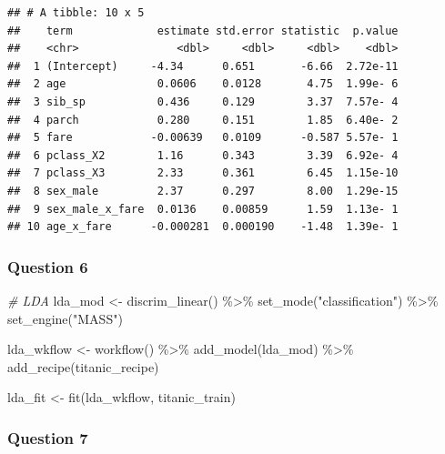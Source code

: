 \documentclass[
]{article}
\newenvironment{Shaded}{\begin{snugshade}}{\end{snugshade}}
\newcommand{\CommentTok}[1]{\textcolor[rgb]{0.56,0.35,0.01}{\textit{#1}}}
\newcommand{\FunctionTok}[1]{\textcolor[rgb]{0.00,0.00,0.00}{#1}}
\newcommand{\NormalTok}[1]{#1}
\newcommand{\OtherTok}[1]{\textcolor[rgb]{0.56,0.35,0.01}{#1}}
\newcommand{\SpecialCharTok}[1]{\textcolor[rgb]{0.00,0.00,0.00}{#1}}
\newcommand{\StringTok}[1]{\textcolor[rgb]{0.31,0.60,0.02}{#1}}
\begin{document}
\begin{verbatim}
## # A tibble: 10 x 5
##    term             estimate std.error statistic  p.value
##    <chr>               <dbl>     <dbl>     <dbl>    <dbl>
##  1 (Intercept)     -4.34      0.651       -6.66  2.72e-11
##  2 age              0.0606    0.0128       4.75  1.99e- 6
##  3 sib_sp           0.436     0.129        3.37  7.57e- 4
##  4 parch            0.280     0.151        1.85  6.40e- 2
##  5 fare            -0.00639   0.0109      -0.587 5.57e- 1
##  6 pclass_X2        1.16      0.343        3.39  6.92e- 4
##  7 pclass_X3        2.33      0.361        6.45  1.15e-10
##  8 sex_male         2.37      0.297        8.00  1.29e-15
##  9 sex_male_x_fare  0.0136    0.00859      1.59  1.13e- 1
## 10 age_x_fare      -0.000281  0.000190    -1.48  1.39e- 1
\end{verbatim}

\hypertarget{question-6}{%
\subsubsection{Question 6}\label{question-6}}

\begin{Shaded}
\begin{Highlighting}[]
\CommentTok{\# LDA}
\NormalTok{lda\_mod }\OtherTok{\textless{}{-}} \FunctionTok{discrim\_linear}\NormalTok{() }\SpecialCharTok{\%\textgreater{}\%}
  \FunctionTok{set\_mode}\NormalTok{(}\StringTok{"classification"}\NormalTok{) }\SpecialCharTok{\%\textgreater{}\%}
  \FunctionTok{set\_engine}\NormalTok{(}\StringTok{"MASS"}\NormalTok{)}

\NormalTok{lda\_wkflow }\OtherTok{\textless{}{-}} \FunctionTok{workflow}\NormalTok{() }\SpecialCharTok{\%\textgreater{}\%}
  \FunctionTok{add\_model}\NormalTok{(lda\_mod) }\SpecialCharTok{\%\textgreater{}\%}
  \FunctionTok{add\_recipe}\NormalTok{(titanic\_recipe)}

\NormalTok{lda\_fit }\OtherTok{\textless{}{-}} \FunctionTok{fit}\NormalTok{(lda\_wkflow, titanic\_train)}
\end{Highlighting}
\end{Shaded}

\hypertarget{question-7}{%
\subsubsection{Question 7}\label{question-7}}
\end{document}
